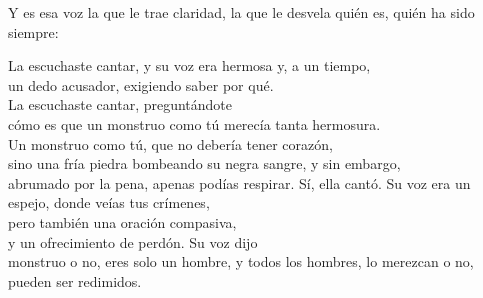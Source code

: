 Y es esa voz la que le trae claridad, la que le desvela quién es, quién ha sido siempre:

\begin{versopropio}
La escuchaste cantar, y su voz era hermosa y, a un tiempo,\\
un dedo acusador, exigiendo saber por qué.\\
La escuchaste cantar, preguntándote\\
cómo es que un monstruo como tú merecía tanta hermosura.\\
Un monstruo como tú, que no debería tener corazón,\\
sino una fría piedra bombeando su negra sangre, y sin embargo,\\
abrumado por la pena, apenas podías respirar.
\stanzabreak
Sí, ella cantó. Su voz era un espejo, donde veías tus crímenes,\\
pero también una oración compasiva,\\
y un ofrecimiento de perdón. Su voz dijo\\
monstruo o no, eres solo un hombre, y todos los hombres,
\stanzabreak
lo merezcan o no,\\
pueden ser redimidos.
\end{versopropio}
